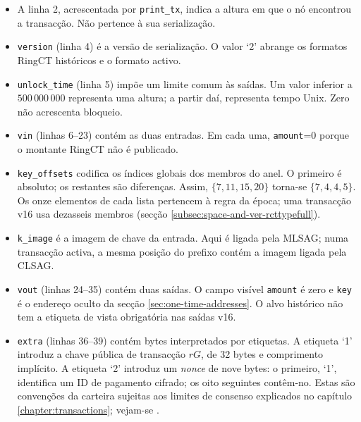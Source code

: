 \begin{appendices}
\begin{itemize}
 \item A linha 2, acrescentada por {\tt print\_tx}, indica a altura em que o nó
 encontrou a transacção. Não pertence à sua serialização.

 \item {\tt version} (linha 4) é a versão de serialização. O valor `2' abrange
 os formatos RingCT históricos e o formato activo.

 \item {\tt unlock\_time} (linha 5) impõe um limite comum às saídas. Um valor
 inferior a \(500\,000\,000\) representa uma altura; a partir daí, representa
 tempo Unix. Zero não acrescenta bloqueio.

 \item {\tt vin} (linhas 6--23) contém as duas entradas. Em cada uma,
 {\tt amount}=0 porque o montante RingCT não é publicado.

 \item {\tt key\_offsets} codifica os índices globais dos membros do anel. O
 primeiro é absoluto; os restantes são diferenças. Assim,
 \(\{7,11,15,20\}\) torna-se \(\{7,4,4,5\}\). Os onze elementos de cada lista
 pertencem à regra da época; uma transacção v16 usa dezasseis membros
 (secção \ref{subsec:space-and-ver-rcttypefull}).

 \item {\tt k\_image} é a imagem de chave da entrada. Aqui é ligada pela
 MLSAG; numa transacção activa, a mesma posição do prefixo contém a imagem
 ligada pela CLSAG.

 \item {\tt vout} (linhas 24--35) contém duas saídas. O campo visível
 {\tt amount} é zero e {\tt key} é o endereço oculto da secção
 \ref{sec:one-time-addresses}. O alvo histórico não tem a etiqueta de vista
 obrigatória nas saídas v16.

 \item {\tt extra} %
(linhas 36--39) contém bytes interpretados por etiquetas.
  A etiqueta
 `1' introduz a chave pública de transacção \(rG\), de 32 bytes e comprimento
 implícito. A etiqueta `2' introduz um \emph{nonce} de nove bytes: o primeiro,
 `1', identifica um ID de pagamento cifrado; os oito seguintes contêm-no.
 Estas são convenções da carteira sujeitas aos limites de consenso explicados
 no capítulo \ref{chapter:transactions}; vejam-se
 \cite{extra-field-stackexchange,tx-extra-field}.


\end{itemize}
\end{appendices}

